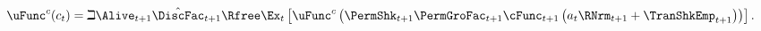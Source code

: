 \begin{equation}\begin{gathered}\begin{aligned}
      \uFunc^{c}(c_{t}) & = \beth\Alive_{t+1}\hat{\DiscFac}_{t+1}\Rfree \Ex_{t}\left[\uFunc^{c}\left(\PermShk_{t+1}\PermGroFac_{t+1}\cFunc_{t+1}\left(a_{t}\RNrm_{t+1}+\TranShkEmp_{t+1}\right)\right)\right]\label{eq:FOCLifeCycle}
      .
    \end{aligned}\end{gathered}\end{equation}
